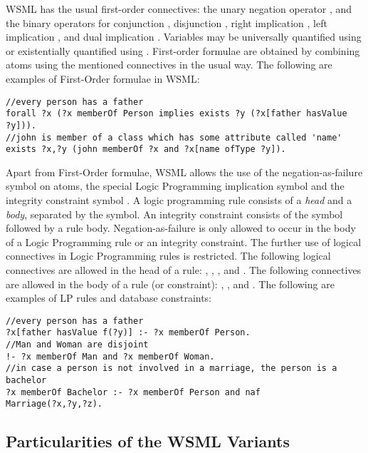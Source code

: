 WSML has the usual first-order connectives: the unary negation
operator , and the binary operators for conjunction
, disjunction , right implication
, left implication , and dual
implication . Variables may be universally
quantified using  or existentially quantified using
. First-order formulae are obtained by combining atoms
using the mentioned connectives in the usual way. The following are
examples of First-Order formulae in WSML:

\begin{lstlisting}[style=wsml, frame=none]
//every person has a father
forall ?x (?x memberOf Person implies exists ?y (?x[father hasValue
?y])).
//john is member of a class which has some attribute called 'name'
exists ?x,?y (john memberOf ?x and ?x[name ofType ?y]).
\end{lstlisting}

Apart from First-Order formulae, WSML allows the use of the
negation-as-failure symbol  on atoms, the special Logic
Programming implication symbol \synkw{:-} and the integrity
constraint symbol \synkw{!-}. A logic programming rule consists of a
\emph{head} and a \emph{body}, separated by the \synkw{:-} symbol.
An integrity constraint consists of the symbol \synkw{!-} followed
by a rule body. Negation-as-failure  is only allowed to
occur in the body of a Logic Programming rule or an integrity
constraint. The further use of logical connectives in Logic
Programming rules is restricted. The following logical connectives
are allowed in the head of a rule: , ,
, and . The following connectives
are allowed in the body of a rule (or constraint): ,
, and . The following are examples of LP rules
and database constraints:

\begin{lstlisting}[style=wsml, frame=none]
//every person has a father
?x[father hasValue f(?y)] :- ?x memberOf Person.
//Man and Woman are disjoint
!- ?x memberOf Man and ?x memberOf Woman.
//in case a person is not involved in a marriage, the person is a bachelor
?x memberOf Bachelor :- ?x memberOf Person and naf
Marriage(?x,?y,?z).
\end{lstlisting}

\subsection{Particularities of the WSML Variants}

